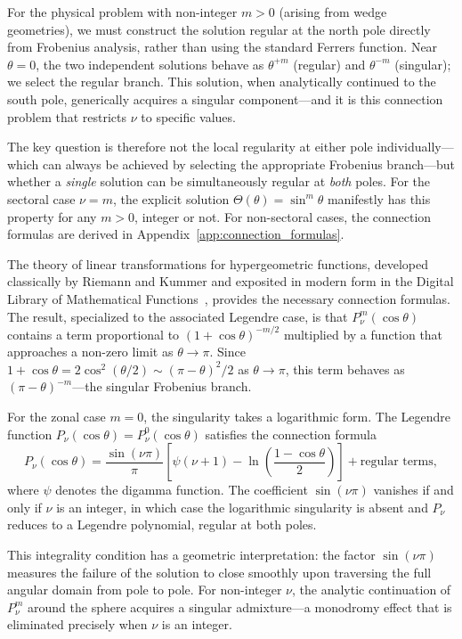 \documentclass[
  aip,
  amsmath,amssymb,
  preprint
]{revtex4-1}
\begin{document}
For the physical problem with non-integer $m > 0$ (arising from wedge geometries), we must construct the solution regular at the north pole directly from Frobenius analysis, rather than using the standard Ferrers function. Near $\theta = 0$, the two independent solutions behave as $\theta^{+m}$ (regular) and $\theta^{-m}$ (singular); we select the regular branch. This solution, when analytically continued to the south pole, generically acquires a singular component---and it is this connection problem that restricts $\nu$ to specific values.

The key question is therefore not the local regularity at either pole individually---which can always be achieved by selecting the appropriate Frobenius branch---but whether a \emph{single} solution can be simultaneously regular at \emph{both} poles. For the sectoral case $\nu = m$, the explicit solution $\Theta(\theta) = \sin^m\theta$ manifestly has this property for any $m > 0$, integer or not. For non-sectoral cases, the connection formulas are derived in Appendix~\ref{app:connection_formulas}.

The theory of linear transformations for hypergeometric functions, developed classically by Riemann and Kummer and exposited in modern form in the Digital Library of Mathematical Functions~\cite{DLMF}, provides the necessary connection formulas. The result, specialized to the associated Legendre case, is that $P_\nu^m(\cos\theta)$ contains a term proportional to $(1+\cos\theta)^{-m/2}$ multiplied by a function that approaches a non-zero limit as $\theta \to \pi$. Since $1 + \cos\theta = 2\cos^2(\theta/2) \sim (\pi-\theta)^2/2$ as $\theta \to \pi$, this term behaves as $(\pi-\theta)^{-m}$---the singular Frobenius branch.

For the zonal case $m = 0$, the singularity takes a logarithmic form. The Legendre function $P_\nu(\cos\theta) = P_\nu^0(\cos\theta)$ satisfies the connection formula
\begin{equation}
P_\nu(\cos\theta) = \frac{\sin(\nu\pi)}{\pi}\left[\psi(\nu+1) - \ln\left(\frac{1-\cos\theta}{2}\right)\right] + \text{regular terms},
\label{eq:Pnu_south_pole}
\end{equation}
where $\psi$ denotes the digamma function. The coefficient $\sin(\nu\pi)$ vanishes if and only if $\nu$ is an integer, in which case the logarithmic singularity is absent and $P_\nu$ reduces to a Legendre polynomial, regular at both poles.

This integrality condition has a geometric interpretation: the factor $\sin(\nu\pi)$ measures the failure of the solution to close smoothly upon traversing the full angular domain from pole to pole. For non-integer $\nu$, the analytic continuation of $P_\nu^m$ around the sphere acquires a singular admixture---a monodromy effect that is eliminated precisely when $\nu$ is an integer.
\end{document}
